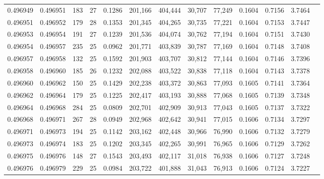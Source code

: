 \begin{tabular}{rrrrrrrrrrrrr}
0.496949 & 0.496951 & 183 &  27 &                                     0.1286 & 201,166 & 404,444 &  30,707 &  77,249 & 0.1604 & 0.7156 & 3.7464 \\
0.496951 & 0.496952 & 179 &  28 &                                     0.1353 & 201,345 & 404,265 &  30,735 &  77,221 & 0.1604 & 0.7153 & 3.7447 \\
0.496953 & 0.496954 & 191 &  27 &                                     0.1239 & 201,536 & 404,074 &  30,762 &  77,194 & 0.1604 & 0.7151 & 3.7430 \\
0.496954 & 0.496957 & 235 &  25 &                                     0.0962 & 201,771 & 403,839 &  30,787 &  77,169 & 0.1604 & 0.7148 & 3.7408 \\
0.496957 & 0.496958 & 132 &  25 &                                     0.1592 & 201,903 & 403,707 &  30,812 &  77,144 & 0.1604 & 0.7146 & 3.7396 \\
0.496958 & 0.496960 & 185 &  26 &                                     0.1232 & 202,088 & 403,522 &  30,838 &  77,118 & 0.1604 & 0.7143 & 3.7378 \\
0.496960 & 0.496962 & 150 &  25 &                                     0.1429 & 202,238 & 403,372 &  30,863 &  77,093 & 0.1605 & 0.7141 & 3.7364 \\
0.496962 & 0.496964 & 179 &  25 &                                     0.1225 & 202,417 & 403,193 &  30,888 &  77,068 & 0.1605 & 0.7139 & 3.7348 \\
0.496964 & 0.496968 & 284 &  25 &                                     0.0809 & 202,701 & 402,909 &  30,913 &  77,043 & 0.1605 & 0.7137 & 3.7322 \\
0.496968 & 0.496971 & 267 &  28 &                                     0.0949 & 202,968 & 402,642 &  30,941 &  77,015 & 0.1606 & 0.7134 & 3.7297 \\
0.496971 & 0.496973 & 194 &  25 &                                     0.1142 & 203,162 & 402,448 &  30,966 &  76,990 & 0.1606 & 0.7132 & 3.7279 \\
0.496973 & 0.496974 & 183 &  25 &                                     0.1202 & 203,345 & 402,265 &  30,991 &  76,965 & 0.1606 & 0.7129 & 3.7262 \\
0.496975 & 0.496976 & 148 &  27 &                                     0.1543 & 203,493 & 402,117 &  31,018 &  76,938 & 0.1606 & 0.7127 & 3.7248 \\
0.496976 & 0.496979 & 229 &  25 &                                     0.0984 & 203,722 & 401,888 &  31,043 &  76,913 & 0.1606 & 0.7124 & 3.7227 \\

\end{tabular}
